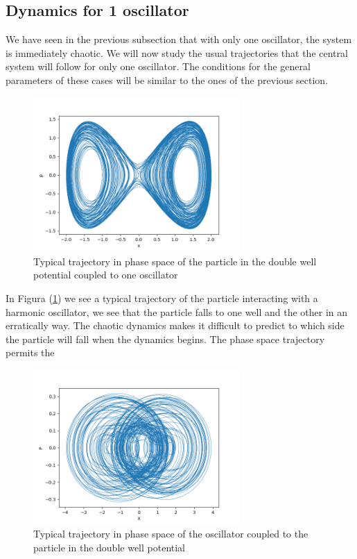 \subsection{Dynamics for 1 oscillator}
We have seen in the previous subsection that with only one oscillator, the system is immediately chaotic. We will now study the usual trajectories that the central system will follow for only one oscillator. The conditions for the general parameters of these cases will be similar to the ones of the previous section. 

\begin{figure}[H]
\centering
\includegraphics[width=0.7\textwidth]{Figures/one_osci_tray.png}
\caption{Typical trajectory in phase space of the particle in the double well potential coupled to one oscillator
}
\label{fig:one_osci_tray}
\end{figure} 

 In Figura (\ref{fig:one_osci_tray}) we see a typical trajectory of the particle interacting with a harmonic oscillator, we see that the particle falls to one well and the other in an erratically way. The chaotic dynamics makes it difficult to predict to which side the particle will fall when the dynamics begins. The phase space trajectory permits the
 
\begin{figure}[H]
\centering
\includegraphics[width=0.7\textwidth]{Figures/one_osci_tray_osci.png}
\caption{Typical trajectory in phase space of the oscillator coupled to the particle in the double well potential 
}
\label{fig:one_osci_tray_osci}
\end{figure} 

